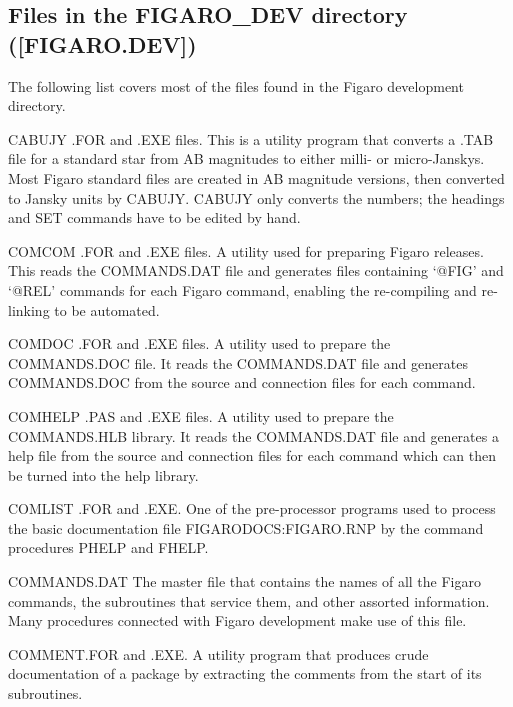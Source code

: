 \subsection{Files in the FIGARO\_DEV directory ([FIGARO.DEV])}

The following list covers most of the files found in the Figaro development
directory.

\begin{description}

\item CABUJY .FOR and .EXE files. This is a utility program that
converts a .TAB file for a standard star from AB magnitudes to either
milli- or micro-Janskys. Most Figaro standard files are created in AB
magnitude versions, then converted to Jansky units by CABUJY. CABUJY only
converts the numbers; the headings and SET commands have to be edited by
hand.

\item COMCOM .FOR and .EXE files. A utility used for preparing Figaro
releases. This reads the COMMANDS.DAT file and generates files
containing `@FIG' and `@REL' commands for each Figaro command, enabling the
re-compiling and re-linking to be automated.

\item COMDOC .FOR and .EXE files. A utility used to prepare the
COMMANDS.DOC file. It reads the COMMANDS.DAT file and generates
COMMANDS.DOC from the source and connection files for each command.

\item COMHELP .PAS and .EXE files.  A utility used to prepare the
COMMANDS.HLB library.  It reads the COMMANDS.DAT file and generates a help
file from the source and connection files for each command which can then be
turned into the help library.

\item COMLIST .FOR and .EXE.  One of the pre-processor programs used to
process the basic documentation file FIGARODOCS:FIGARO.RNP by the command
procedures PHELP and FHELP.

\item COMMANDS.DAT The master file that contains the names of all the Figaro
commands, the subroutines that service them, and other assorted information.
Many procedures connected with Figaro development make use of this file.

\item COMMENT.FOR and .EXE.  A utility program that produces  crude
documentation of a package by extracting the comments from the start
of its subroutines.


\end{description}
